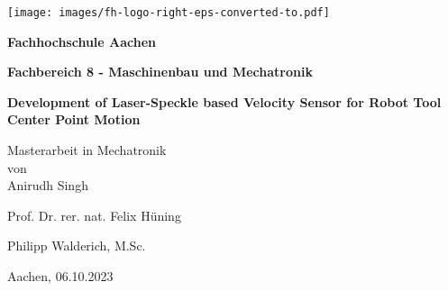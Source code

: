 \newcommand{\titlename}{Development of Laser-Speckle based Velocity Sensor for Robot Tool Center Point Motion}
\newcommand{\authorname}{Anirudh Singh}
\newcommand{\professor}{Prof. Dr. rer. nat. Felix Hüning}
\newcommand{\supervisor}{Philipp Walderich, M.Sc.}
\newcommand{\department}{Fachbereich 8 - Maschinenbau und Mechatronik}
\newcommand{\university}{Fachhochschule Aachen}
\newcommand{\city}{Aachen}

\newcommand{\YEAR}{2023}
\newcommand{\MONTH}{10}
\newcommand{\DAY}{06}
\newcommand{\submissionDate}{\DAY.\MONTH.\YEAR}



\begin{titlepage}
    \begin{center}
        
        \texttt{[image: images/fh-logo-right-eps-converted-to.pdf]}
        
        \vspace{1cm}

        {\Huge\bfseries \university}
        
        \vspace{2cm}

        {\large\bfseries \department}

        \vspace{2cm}

        \begin{spacing}{1.5}
            {\Large\bfseries \titlename}
        \end{spacing}
        
        \vspace{3cm}

        \large{Masterarbeit in Mechatronik} \\
        \vspace{5mm}
        \large{von} \\
        \vspace{5mm}
        {\large \authorname}

        \vspace{2cm}
        
        {\large \professor}
        
        \vspace{1cm}

        {\large \supervisor}

        \vfill

        {\large \city}, {\large \submissionDate}
        
    \end{center}

\end{titlepage}